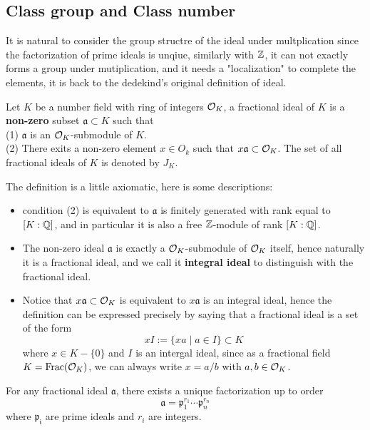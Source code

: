     \subsection{Class group and Class number}

It is natural to consider the group structre of the ideal under multplication since the factorization of prime ideals is unqiue, similarly with \(\mathbb{Z}\), it can not exactly forms a group under mutiplication, and it needs a "localization" to complete the elements, it is back to the dedekind's original definition of ideal.

\begin{definition}
    Let \(K\) be a number field with ring of integers \(\mathcal{O}_K\), a fractional ideal of \(K\) is a \textbf{non-zero} subset \(\mathfrak{a} \subset K\) such that\\
    (1) \(\mathfrak{a}\) is an \(\mathcal{O}_K\)-submodule of \(K\).\\
    (2) There exits a non-zero element \(x \in O_k\) such that \(x \mathfrak{a} \subset \mathcal{O}_K\).
    The set of all fractional ideals of \(K\) is denoted by \(J_K\).
\end{definition}

\begin{remark}
    The definition is a little axiomatic, here is some descriptions:
    \begin{itemize}
        \item condition (2) is equivalent to \(\mathfrak{a}\) is finitely generated with rank equal to \([K:\mathbb{Q}]\), and in particular it is also a free \(\mathbb{Z}\)-module of rank \([K:\mathbb{Q}]\).
        \item  The non-zero ideal \(\mathfrak{a}\) is exactly a \(\mathcal{O}_K\)-submodule of \(\mathcal{O}_K\) itself, hence naturally it is a fractional ideal, and we call it \textbf{integral ideal} to distinguish with the fractional ideal.
        \item Notice that \(x\mathfrak{a} \subset \mathcal{O}_K\) is equivalent to \(x\mathfrak{a}\) is an integral ideal, hence the definition can be expressed precisely by saying that a fractional ideal is a set of the form
        \[xI := \{xa \mid a \in I\} \subset K\] 
        where \(x \in K-\{0\}\) and \(I\) is an intergal ideal, since as a fractional field \(K = \mathrm{Frac}(\mathcal{O}_K)\), we can always write \(x = a/b\) with \(a,b \in \mathcal{O}_K\).

    \end{itemize}
\end{remark}


\begin{colorlemma}
    For any fractional ideal \(\mathfrak{a}\), there exists a unique factorization up to order \[\mathfrak{a} = \mathfrak{p}_1^{r_1} \cdots \mathfrak{p}_n^{r_n}\]
    where \(\mathfrak{p_i}\) are prime ideals and \(r_i\) are integers.
\end{colorlemma}

